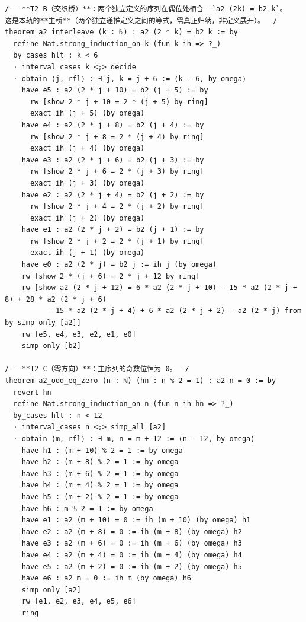 \documentclass[11pt]{article}
\begin{document}
\begin{lstlisting}[caption={Verbatim excerpt, lines 36--139 of \texttt{final/02-mod3x3-proved.lean} (139 lines, sha256 \texttt{79c19719}...); the full text is in the deposit's \texttt{proofs/}.},label={lst:proof}]
/-- **T2-B（交织桥）**：两个独立定义的序列在偶位处相合——`a2 (2k) = b2 k`。
这是本轨的**主桥**（两个独立递推定义之间的等式，需真正归纳，非定义展开）。 -/
theorem a2_interleave (k : ℕ) : a2 (2 * k) = b2 k := by
  refine Nat.strong_induction_on k (fun k ih => ?_)
  by_cases hlt : k < 6
  · interval_cases k <;> decide
  · obtain ⟨j, rfl⟩ : ∃ j, k = j + 6 := ⟨k - 6, by omega⟩
    have e5 : a2 (2 * j + 10) = b2 (j + 5) := by
      rw [show 2 * j + 10 = 2 * (j + 5) by ring]
      exact ih (j + 5) (by omega)
    have e4 : a2 (2 * j + 8) = b2 (j + 4) := by
      rw [show 2 * j + 8 = 2 * (j + 4) by ring]
      exact ih (j + 4) (by omega)
    have e3 : a2 (2 * j + 6) = b2 (j + 3) := by
      rw [show 2 * j + 6 = 2 * (j + 3) by ring]
      exact ih (j + 3) (by omega)
    have e2 : a2 (2 * j + 4) = b2 (j + 2) := by
      rw [show 2 * j + 4 = 2 * (j + 2) by ring]
      exact ih (j + 2) (by omega)
    have e1 : a2 (2 * j + 2) = b2 (j + 1) := by
      rw [show 2 * j + 2 = 2 * (j + 1) by ring]
      exact ih (j + 1) (by omega)
    have e0 : a2 (2 * j) = b2 j := ih j (by omega)
    rw [show 2 * (j + 6) = 2 * j + 12 by ring]
    rw [show a2 (2 * j + 12) = 6 * a2 (2 * j + 10) - 15 * a2 (2 * j + 8) + 28 * a2 (2 * j + 6)
          - 15 * a2 (2 * j + 4) + 6 * a2 (2 * j + 2) - a2 (2 * j) from by simp only [a2]]
    rw [e5, e4, e3, e2, e1, e0]
    simp only [b2]

/-- **T2-C（零方向）**：主序列的奇数位恒为 0。 -/
theorem a2_odd_eq_zero (n : ℕ) (hn : n % 2 = 1) : a2 n = 0 := by
  revert hn
  refine Nat.strong_induction_on n (fun n ih hn => ?_)
  by_cases hlt : n < 12
  · interval_cases n <;> simp_all [a2]
  · obtain ⟨m, rfl⟩ : ∃ m, n = m + 12 := ⟨n - 12, by omega⟩
    have h1 : (m + 10) % 2 = 1 := by omega
    have h2 : (m + 8) % 2 = 1 := by omega
    have h3 : (m + 6) % 2 = 1 := by omega
    have h4 : (m + 4) % 2 = 1 := by omega
    have h5 : (m + 2) % 2 = 1 := by omega
    have h6 : m % 2 = 1 := by omega
    have e1 : a2 (m + 10) = 0 := ih (m + 10) (by omega) h1
    have e2 : a2 (m + 8) = 0 := ih (m + 8) (by omega) h2
    have e3 : a2 (m + 6) = 0 := ih (m + 6) (by omega) h3
    have e4 : a2 (m + 4) = 0 := ih (m + 4) (by omega) h4
    have e5 : a2 (m + 2) = 0 := ih (m + 2) (by omega) h5
    have e6 : a2 m = 0 := ih m (by omega) h6
    simp only [a2]
    rw [e1, e2, e3, e4, e5, e6]
    ring
\end{lstlisting}
\end{document}
